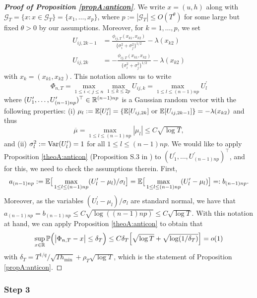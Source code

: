 \documentclass[a4paper,12pt]{article}
\begin{document}
\begin{proof}[\textnormal{\textbf{Proof of Proposition \ref{propA:anticon}}}] 

We write $x = (u,h)$ along with $\mathcal{G}_T = \{ x : x \in \mathcal{G}_T \} = \{x_1,\ldots,x_p\}$, where $p := |\mathcal{G}_T| \le O(T^\theta)$ for some large but fixed $\theta > 0$ by our assumptions. Moreover, for $k = 1,\ldots,p$, we set 
\begin{align*}
U_{ij, 2k-1} & = \frac{\phi_{ij, T}(x_{k1},x_{k2})}{\{{\sigma}_i^2 + {\sigma}_j^2\}^{1/2}} - \lambda(x_{k2}) \\
U_{ij, 2k} & = -\frac{\phi_{ij, T}(x_{k1},x_{k2})}{\{{\sigma}_i^2 + {\sigma}_j^2\}^{1/2}} - \lambda(x_{k2}) 
\end{align*}
with $x_k = (x_{k1},x_{k2})$. This notation allows us to write
\[ \Phi_{n, T} = \max_{1\le i < j \le n} \max_{1 \le k \le 2p} U_{ij, k} = \max_{1 \leq l \leq (n-1)np} U^\prime_l\]
where $(U^\prime_{1},\ldots,U^\prime_{(n-1)np})^\top \in \mathbb{R}^{(n-1)np}$ is a Gaussian random vector with the following properties: (i) $\mu_{l} := \mathbb{E}[U^\prime_l] = \{\mathbb{E}[U_{ij, 2k}] \text{ or }\mathbb{E}[U_{ij, 2k-1}]\}= - \lambda(x_{k2}) $ and thus
$$\overline{\mu} = \max_{1\leq l \leq (n-1)np} |\mu_{l}| \leq C \sqrt{\log T},$$
and (ii) $\sigma_{l}^2 := \textnormal{Var}(U^\prime_{l}) = 1$ for all $1 \leq l \leq (n-1)np$. We would like to apply \linebreak Proposition \ref{theoA:anticon} (Proposition S.3 in \cite{KhismatullinaVogt2020}) to  $(U^\prime_{1},\ldots,U^\prime_{(n-1)np})^\top$, and for this, we need to check the assumptions therein. First, 
$$a_{(n-1)np} := \mathbb{E}\big[ \max_{1 \le l \le (n-1)np} (U_l^\prime -\mu_l)/\sigma_l \big] =\mathbb{E}\big[ \max_{1 \le l \le (n-1)np} (U_l^\prime-\mu_l) \big] = : b_{(n-1)np}.$$ Moreover, as the variables $(U^\prime_l - \mu_l)/\sigma_l$ are standard normal, we have that \linebreak $a_{(n-1)np} = b_{(n-1)np} \le C\sqrt{\log ((n-1)np)} \leq C \sqrt{\log T}$. With this notation at hand, we can apply Proposition \ref{theoA:anticon} to obtain that 
\[ \sup_{x \in \mathbb{R}} \mathbb{P} \Big( \big| \Phi_{n, T} - x \big| \le \delta_T \Big) \le C \delta_T \Big[ \sqrt{\log T} + \sqrt{ \log(1/\delta_T) } \Big] = o(1) \]
with $\delta_T = T^{1/q} / \sqrt{T h_{\min}} + \rho_T \sqrt{\log T}$, which is the statement of Proposition \ref{propA:anticon}.
\end{proof}

\subsubsection*{Step 3}
\end{document}
